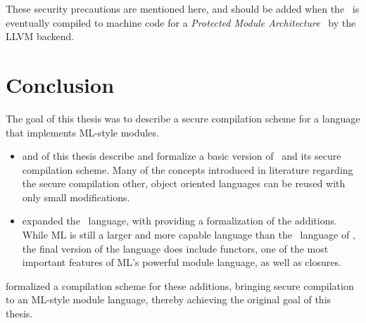 \begin{itemize}
These security precautions are mentioned here, and should be added when the \LLVMIR\ is eventually compiled to machine code for a \emph{Protected Module Architecture}~\cite{PCBAC} by the LLVM backend.
\end{itemize}


\section{Conclusion}
\label{sec:Conclusion}
The goal of this thesis was to describe a secure compilation scheme for a language that implements ML-style modules.
\begin{itemize}
\item
{} and  of this thesis describe and formalize a basic version of \MiniML\ and its secure compilation scheme.
Many of the concepts introduced in literature regarding the secure compilation other, object oriented languages can be reused with only small modifications.

\item
{} expanded the \MiniML\ language, with  providing a formalization of the additions.
While ML is  still a larger and more capable language than the \MiniML\ language of , the final version of the language does include functors, one of the most important features of ML's powerful module language, as well as closures.
\end{itemize}

 formalized a compilation scheme for these additions, bringing secure compilation to an ML-style module language, thereby achieving the original goal of this thesis. 
